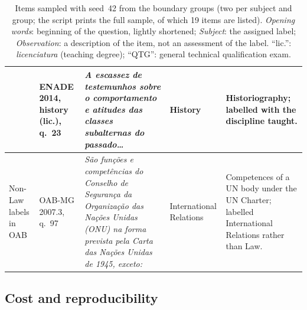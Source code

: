 \begin{table}[t]
\begin{tabular}{@{}llp{}lp{}@{}}
 & ENADE 2014, history (lic.), q.~23 & \emph{A escassez de testemunhos sobre o comportamento e atitudes das classes subalternas do passado\ldots} & History & Historiography; labelled with the discipline taught. \\
\midrule
Non-Law labels in OAB & OAB-MG 2007.3, q.~97 & \emph{São funções e competências do Conselho de Segurança da Organização das Nações Unidas (ONU) na forma prevista pela Carta das Nações Unidas de 1945, exceto:} & International Relations & Competences of a UN body under the UN Charter; labelled International Relations rather than Law. \\
\bottomrule
\end{tabular}
\caption{Items sampled with seed~42 from the boundary groups (two per
subject and group; the script prints the full sample, of which 19 items are
listed). \emph{Opening words}: beginning of the question, lightly shortened;
\emph{Subject}: the assigned label; \emph{Observation}: a description of the
item, not an assessment of the label. ``lic.'': \emph{licenciatura}
(teaching degree); ``QTG'': general technical qualification exam.}
\label{tab:kc-boundary}
\end{table}

\subsection{Cost and reproducibility}
\label{app:kc-cost}

